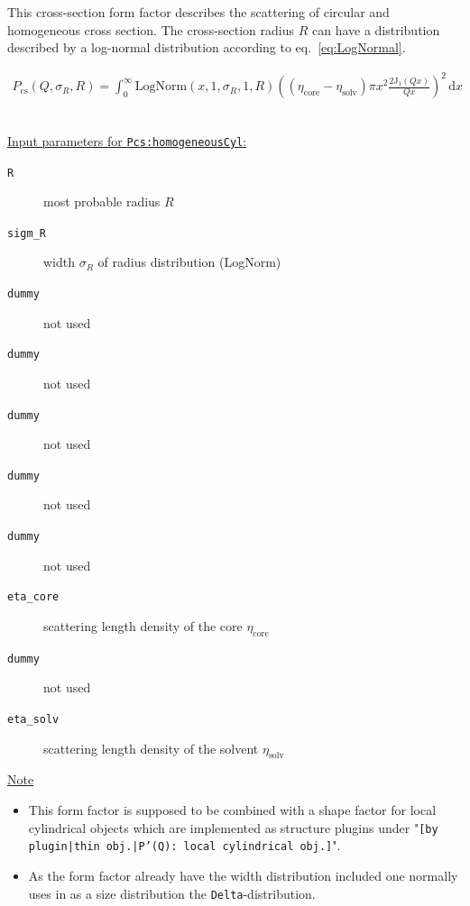 This cross-section form factor describes the scattering of circular and homogeneous cross section.
The cross-section radius $R$ can have a distribution described by a log-normal distribution according
to eq.\ \ref{eq:LogNormal}.

\begin{align}
P_\text{cs}(Q,\sigma_{R},R) = \int_0^\infty \textrm{LogNorm}(x,1,\sigma_{R},1,R) \left( \left(\eta_\textrm{core}-\eta_\textrm{solv}\right) \pi x^2 \frac{2 \mathrm{J}_1(Qx)}{Qx} \right)^2 \, \textrm{d}x
\end{align}

\vspace{5mm}

\hspace{1pt}\\
\underline{Input parameters for \texttt{Pcs:homogeneousCyl}:}
\begin{description}
    \item[\texttt{R}] most probable radius $R$
    \item[\texttt{sigm\_R}] width $\sigma_R$ of radius distribution (LogNorm)
    \item[\texttt{dummy}] not used
    \item[\texttt{dummy}] not used
    \item[\texttt{dummy}] not used
    \item[\texttt{dummy}] not used
    \item[\texttt{dummy}] not used
    \item[\texttt{eta\_core}] scattering length density of the core $\eta_\textrm{core}$
    \item[\texttt{dummy}] not used
    \item[\texttt{eta\_solv}] scattering length density of the solvent $\eta_\textrm{solv}$
\end{description}

\noindent
\underline{Note}
\begin{itemize}
  \item This form factor is supposed to be combined with a shape factor for
local cylindrical objects which are implemented as structure  plugins
under "\texttt{[by plugin|thin obj.|P'(Q): local cylindrical obj.]}".
\item As the form factor already have the width distribution included one normally uses in \SASfit as a size distribution
the \texttt{Delta}-distribution.
\end{itemize}

